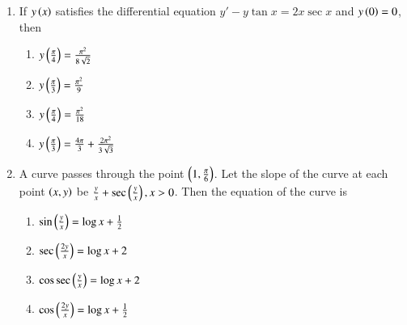 \documentclass[journal,12pt,twocolumn]{IEEEtran}
\theoremstyle{remark}
\begin{document}
\begin{enumerate}
\item  If $y\left(x\right)$ satisfies the differential equation $y' - y \tan x = 2x \sec x $ and $y\left(0\right) = 0 $, then

\begin{multicols}{2}
\begin{enumerate}
    \item $ y\left(\frac{\pi}{4}\right) = \frac{\pi^2}{8\sqrt{2}} $
    \item $ y\left(\frac{\pi}{3}\right) = \frac{\pi^2}{9} $
    \item $ y\left(\frac{\pi}{4}\right) = \frac{\pi^2}{18} $
    \item $ y\left(\frac{\pi}{3}\right) = \frac{4\pi}{3} + \frac{2\pi^2}{3\sqrt{3}} $
\end{enumerate}
\end{multicols}

\item A curve passes through the point $ \left(1,\frac{\pi}{6}\right) $. Let the slope of the curve at each point $ \left(x, y\right) $ be $ \frac{y}{x} + \sec\left(\frac{y}{x}\right), x > 0 $. Then the equation of the curve is 

\begin{multicols}{2}
\begin{enumerate}
    \item $ \sin\left(\frac{y}{x}\right) = \log x + \frac{1}{2} $
    \item $\sec\left(\frac{2y}{x}\right) = \log x + 2$
    \item $\cos\sec\left(\frac{y}{x}\right) = \log x + 2 $
    \item $ \cos\left(\frac{2y}{x}\right) = \log x + \frac{1}{2} $
\end{enumerate}
\end{multicols}
\end{enumerate}
\end{document}
